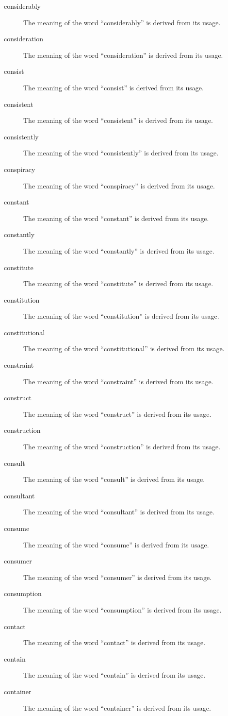\documentclass[12pt, letterpaper]{memoir}
\begin{document}
\begin{description}
\item[considerably] The meaning of the word ``considerably'' is derived from its usage.
\item[consideration] The meaning of the word ``consideration'' is derived from its usage.
\item[consist] The meaning of the word ``consist'' is derived from its usage.
\item[consistent] The meaning of the word ``consistent'' is derived from its usage.
\item[consistently] The meaning of the word ``consistently'' is derived from its usage.
\item[conspiracy] The meaning of the word ``conspiracy'' is derived from its usage.
\item[constant] The meaning of the word ``constant'' is derived from its usage.
\item[constantly] The meaning of the word ``constantly'' is derived from its usage.
\item[constitute] The meaning of the word ``constitute'' is derived from its usage.
\item[constitution] The meaning of the word ``constitution'' is derived from its usage.
\item[constitutional] The meaning of the word ``constitutional'' is derived from its usage.
\item[constraint] The meaning of the word ``constraint'' is derived from its usage.
\item[construct] The meaning of the word ``construct'' is derived from its usage.
\item[construction] The meaning of the word ``construction'' is derived from its usage.
\item[consult] The meaning of the word ``consult'' is derived from its usage.
\item[consultant] The meaning of the word ``consultant'' is derived from its usage.
\item[consume] The meaning of the word ``consume'' is derived from its usage.
\item[consumer] The meaning of the word ``consumer'' is derived from its usage.
\item[consumption] The meaning of the word ``consumption'' is derived from its usage.
\item[contact] The meaning of the word ``contact'' is derived from its usage.
\item[contain] The meaning of the word ``contain'' is derived from its usage.
\item[container] The meaning of the word ``container'' is derived from its usage.

\end{description}
\end{document}
